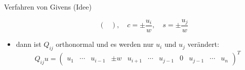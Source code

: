 \begin{bonus}{Verfahren von Givens (Idee)}
\begin{itemize}
\begin{itemize}
\[\begin{pmatrix}
                            \end{pmatrix},
                            \quad
                            c = \pm \frac{u_i}{w},
                            \quad
                            s = \pm \frac{u_j}{w}
                        \]
              \end{itemize}
        \item dann ist $Q_{ij}$ orthonormal und es werden nur $u_i$ und $u_j$ verändert:
              \[
                  Q_{ij}u =
                  \begin{pmatrix}
                      u_1 & \cdots & u_{i-1} & \pm w & u_{i+1} & \cdots & u_{j-1} & 0 & u_{j-1} & \cdots & u_{n}
                  \end{pmatrix}^T
              \]
    \end{itemize}
\end{bonus}

